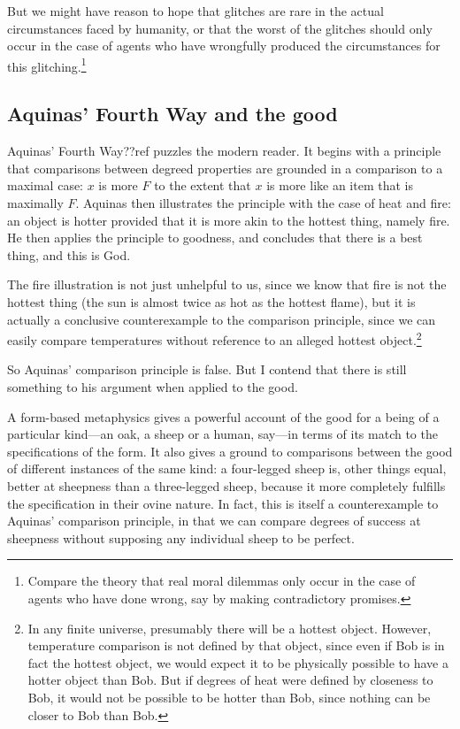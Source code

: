 But we might have reason to hope that glitches are rare in the actual circumstances faced by humanity, or that the worst of the
glitches should only occur in the case of agents who have wrongfully produced the circumstances for this glitching.\footnote{Compare the theory that real moral
dilemmas only occur in the case of agents who have done wrong, say by making contradictory promises.} 

\subsection{Aquinas' Fourth Way and the good}
Aquinas' Fourth Way??ref puzzles the modern reader. It begins with a principle that comparisons between
degreed properties are grounded in a comparison to a maximal case: $x$ is more $F$ to the extent that $x$ is more 
like an item that is maximally $F$. Aquinas then illustrates the principle with the case of heat and fire:
an object is hotter provided that it is more akin to the hottest thing, namely fire. He then applies
the principle to goodness, and concludes that there is a best thing, and this is God.

The fire illustration is not just unhelpful to us, since we know that fire is not the hottest thing (the sun is almost
twice as hot as the hottest flame), but it is actually a conclusive counterexample to the comparison principle,
since we can easily compare temperatures without reference to an alleged hottest object.\footnote{In any finite universe,
presumably there will be a hottest object. However, temperature comparison is not defined by that object, since 
even if Bob is in fact the hottest object, we would expect it to be physically possible to have a hotter object 
than Bob. But if degrees of heat were defined by closeness to Bob, it would not be possible to be hotter than
Bob, since nothing can be closer to Bob than Bob.}

So Aquinas' comparison principle is false. But I contend that there is still something to his argument
when applied to the good. 

A form-based metaphysics gives a powerful account of the good for a being of
a particular kind---an oak, a sheep or a human, say---in terms of its match to the specifications of the
form. It also gives a ground to comparisons between the good of different instances of the same kind:
a four-legged sheep is, other things equal, better at sheepness than a three-legged sheep, because it
more completely fulfills the specification in their ovine nature. In fact, this is itself a counterexample 
to Aquinas' comparison principle, in that we can compare degrees of success at sheepness without supposing
any individual sheep to be perfect.

